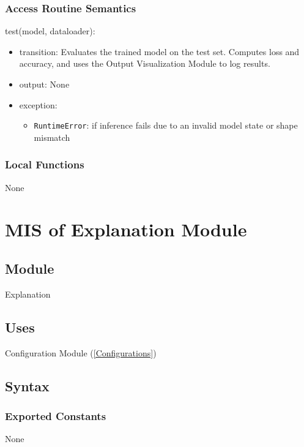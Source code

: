 \documentclass[12pt, titlepage]{article}
\begin{document}
\subsubsection{Access Routine Semantics}

\noindent test(model, dataloader):
\begin{itemize}
\item transition: Evaluates the trained model on the test set. Computes loss and accuracy, and uses the Output Visualization Module to log results.
\item output: None
\item exception:     
    \begin{itemize}
        \item \texttt{RuntimeError}: if inference fails due to an invalid model state or shape mismatch
    \end{itemize}
\end{itemize}

\subsubsection{Local Functions}
None














\section{MIS of Explanation Module} \label{Explanation}

\subsection{Module}
Explanation

\subsection{Uses}
Configuration Module (\ref{Configurations})

\subsection{Syntax}

\subsubsection{Exported Constants}
None
\end{document}
